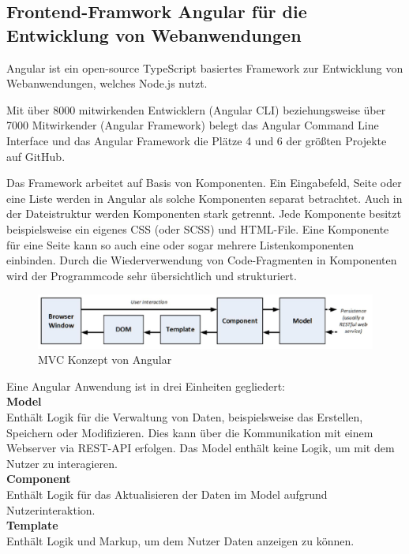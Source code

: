 \subsection{Frontend-Framwork Angular für die Entwicklung von Webanwendungen}

Angular ist ein open-source TypeScript basiertes Framework zur Entwicklung von Webanwendungen, welches Node.js nutzt.


Mit über 8000 mitwirkenden Entwicklern (Angular CLI) beziehungsweise über 7000 Mitwirkender (Angular Framework) belegt das Angular Command Line Interface und das Angular Framework die Plätze 4 und 6 der größten Projekte auf GitHub. 
\cite{OctoverseGitHubStatistics}

Das Framework arbeitet auf Basis von Komponenten. Ein Eingabefeld, Seite oder eine Liste werden in Angular als solche Komponenten separat betrachtet. Auch in der Dateistruktur werden Komponenten stark getrennt. Jede Komponente besitzt beispielsweise ein eigenes CSS (oder SCSS) und HTML-File. Eine Komponente für eine Seite kann so auch eine oder sogar mehrere Listenkomponenten einbinden. Durch die Wiederverwendung von Code-Fragmenten in Komponenten wird der Programmcode sehr übersichtlich und strukturiert.

\begin{figure}[h!]
        \includegraphics[width=\linewidth]{img/Angular_MVC.JPG}
        \centering
        \caption{MVC Konzept von Angular \cite[S. 35, Abbildung 3-4]{ProAngular}}
        \label{fig:angularmvc}
\end{figure}

Eine Angular Anwendung ist in drei Einheiten gegliedert:\\

\textbf{Model}\\ 
Enthält Logik für die Verwaltung von Daten, beispielsweise das Erstellen, Speichern oder Modifizieren. Dies kann über die Kommunikation mit einem Webserver via REST-API erfolgen. Das Model enthält keine Logik, um mit dem Nutzer zu interagieren.\\

\textbf{Component}\\
Enthält Logik für das Aktualisieren der Daten im Model aufgrund Nutzerinteraktion. \\

\textbf{Template}\\ 
Enthält Logik und Markup, um dem Nutzer Daten anzeigen zu können.

\cite{ProAngular}